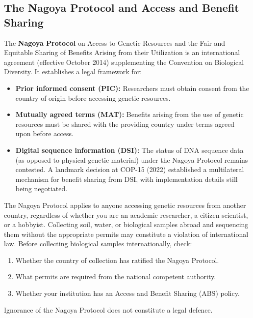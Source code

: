\subsection{The Nagoya Protocol and Access and Benefit Sharing}
\label{subsec:accessible:nagoya}

The \textbf{Nagoya Protocol} on Access to Genetic Resources and the Fair and Equitable Sharing of Benefits Arising from their Utilization is an international agreement (effective October 2014) supplementing the Convention on Biological Diversity. It establishes a legal framework for:

\begin{itemize}[itemsep=2pt]
  \item \textbf{Prior informed consent (PIC):} Researchers must obtain consent from the country of origin before accessing genetic resources.
  \item \textbf{Mutually agreed terms (MAT):} Benefits arising from the use of genetic resources must be shared with the providing country under terms agreed upon before access.
  \item \textbf{Digital sequence information (DSI):} The status of DNA sequence data (as opposed to physical genetic material) under the Nagoya Protocol remains contested. A landmark decision at COP-15 (2022) established a multilateral mechanism for benefit sharing from DSI, with implementation details still being negotiated.
\end{itemize}

\begin{warningbox}[title={Nagoya Protocol Compliance}]
The Nagoya Protocol applies to anyone accessing genetic resources from another country, regardless of whether you are an academic researcher, a citizen scientist, or a hobbyist. Collecting soil, water, or biological samples abroad and sequencing them without the appropriate permits may constitute a violation of international law. Before collecting biological samples internationally, check:
\begin{enumerate}[nosep]
  \item Whether the country of collection has ratified the Nagoya Protocol.
  \item What permits are required from the national competent authority.
  \item Whether your institution has an Access and Benefit Sharing (ABS) policy.
\end{enumerate}
Ignorance of the Nagoya Protocol does not constitute a legal defence.
\end{warningbox}

